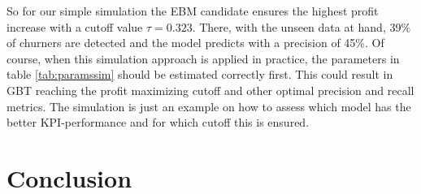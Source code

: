\documentclass[12pt,titlepage]{article}
\begin{document}
\noindent
So for our simple simulation the EBM candidate ensures the highest profit increase with a cutoff value $\tau=0.323$. There, with the unseen data at hand, 39\% of churners are detected and the model predicts with a precision of 45\%. Of course, when this simulation approach is applied in practice, the parameters in table \ref{tab:paramssim} should be estimated correctly first. This could result in GBT reaching the profit maximizing cutoff and other optimal precision and recall metrics. The simulation is just an example on how to assess which model has the better KPI-performance and for which cutoff this is ensured. \\

\section{Conclusion} \par
\end{document}
